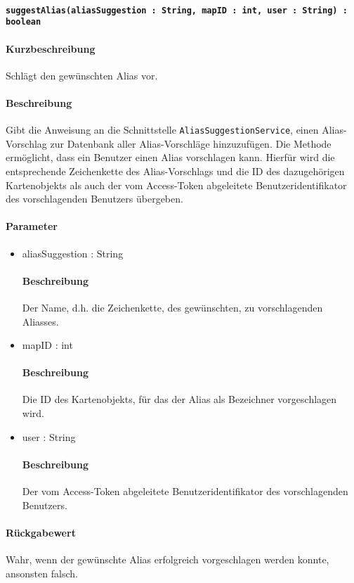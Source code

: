 \paragraph*{\texttt{suggestAlias(aliasSuggestion : String, mapID : int, user : String) : boolean}}%
\paragraph*{Kurzbeschreibung}
Schlägt den gewünschten Alias vor.
\paragraph*{Beschreibung}
Gibt die Anweisung an die Schnittstelle \texttt{AliasSuggestionService}, einen Alias-Vorschlag zur Datenbank aller Alias-Vorschläge hinzuzufügen.
Die Methode ermöglicht, dass ein Benutzer einen Alias vorschlagen kann. 
Hierfür wird die entsprechende Zeichenkette des Alias-Vorschlags und die ID des dazugehörigen Kartenobjekts als auch der vom Access-Token abgeleitete Benutzeridentifikator des vorschlagenden Benutzers übergeben.
\paragraph*{Parameter}
\begin{itemize}
	\item aliasSuggestion : String
		\paragraph*{Beschreibung}
		Der Name, d.h. die Zeichenkette, des gewünschten, zu vorschlagenden Aliasses.
	\item mapID : int
		\paragraph*{Beschreibung}
		Die ID des Kartenobjekts, für das der Alias als Bezeichner vorgeschlagen wird.
	\item user : String
		\paragraph*{Beschreibung}
		Der vom Access-Token abgeleitete Benutzeridentifikator des vorschlagenden Benutzers.
\end{itemize}
\paragraph*{Rückgabewert}
Wahr, wenn der gewünschte Alias erfolgreich vorgeschlagen werden konnte, ansonsten falsch.
